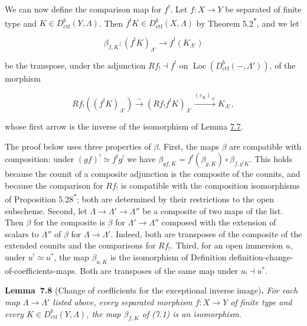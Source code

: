 \documentclass[11pt]{article}
\newenvironment{bpstatement}[2]{\par\addvspace{0.6\baselineskip}\noindent\textbf{#1}#2\textbf{.}\enspace\ignorespaces}
  {\par\addvspace{0.4\baselineskip}}
\newenvironment{bpstatementit}[2]{\begin{bpstatement}{#1}{#2}\itshape\ignorespaces}{\end{bpstatement}}
\newcommand{\bpout}[1]{#1\textsuperscript{\hyperlink{bp-outside}{\ensuremath{\ast}}}}
\providecommand{\Loc}{}\renewcommand{\Loc}{\operatorname{Loc}}
\begin{document}
\label{bp20}%
We can now define the comparison map for \(f^!\). Let \(f:X\to Y\) be separated of finite type and \(K\in D^b_{\mathrm{ctf}}(Y,\Lambda)\). Then \(f^!K\in D^b_{\mathrm{ctf}}(X,\Lambda)\) by Theorem \bpout{5.2}, and we let

\[
\beta_{f,K}:(f^!K)_{\Lambda'}\longrightarrow f^!(K_{\Lambda'})
\tag{7.1}
\]

be the transpose, under the adjunction \(Rf_!\dashv f^!\) on \(\Loc(D^b_{\mathrm{ctf}}(-,\Lambda'))\), of the morphism

\[
Rf_!((f^!K)_{\Lambda'})
\xrightarrow{\sim}(Rf_!f^!K)_{\Lambda'}
\xrightarrow{(\varepsilon_K)_{\Lambda'}}K_{\Lambda'},
\]

whose first arrow is the inverse of the isomorphism of Lemma \hyperref[bp18]{7.7}.

The proof below uses three properties of \(\beta\). First, the maps \(\beta\) are compatible with composition: under \((gf)^!\simeq f^!g^!\) we have \(\beta_{gf,K}=f^!(\beta_{g,K})\circ\beta_{f,g^!K}\). This holds because the counit of a composite adjunction is the composite of the counits, and because the comparison for \(Rf_!\) is compatible with the composition isomorphisms of Proposition \bpout{5.28}; both are determined by their restrictions to the open subscheme. Second, let \(\Lambda\to\Lambda'\to\Lambda''\) be a composite of two maps of the list. Then \(\beta\) for the composite is \(\beta\) for \(\Lambda'\to\Lambda''\) composed with the extension of scalars to \(\Lambda''\) of \(\beta\) for \(\Lambda\to\Lambda'\). Indeed, both are transposes of the composite of the extended counits and the comparisons for \(Rf_!\). Third, for an open immersion \(u\), under \(u^!\simeq u^*\), the map \(\beta_{u,K}\) is the isomorphism of Definition definition-change-of-coefficients-maps. Both are transposes of the same map under \(u_!\dashv u^*\).

\label{bp21}%
\begin{bpstatementit}{Lemma~7.8}{ (Change of coefficients for the exceptional inverse image)}
For each map \(\Lambda\to\Lambda'\) listed above, every separated morphism \(f:X\to Y\) of finite type and every \(K\in D^b_{\mathrm{ctf}}(Y,\Lambda)\), the map \(\beta_{f,K}\) of (7.1) is an isomorphism.
\end{bpstatementit}
\end{document}
